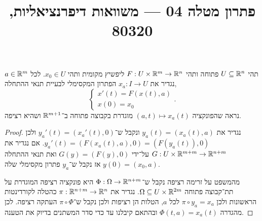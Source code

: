 
\title{פתרון מטלה 04 --- משוואות דיפרנציאליות, 80320}

\DeclareMathOperator{\sgn}{sgn}


\maketitle
\maketitleprint[blue]{}

\question{}
תהי $U \subseteq \mathbb{R}^n$ פתוחה ותהי $F : U \times \mathbb{R}^m \to \mathbb{R}^n$ ליפשיץ מקומית ותהי $x_0 \in U$.
לכל $a \in \mathbb{R}^m$ נגדיר את $x_a : I \to U$ הפתרון המקסימלי לבעיית תנאי ההתחלה,
\[
	\begin{cases}
		x'(t) = F(x(t), a) \\
		x(0) = x_0
	\end{cases}
.\]
נראה שהפונקציה $(a, t) \mapsto x_a(t)$ מוגדרת בקבוצה פתוחה ב־$\mathbb{R}^{m + 1}$ ושהיא רציפה.
\begin{proof}
	נגדיר את $y_a(t) = (x_a(t), a)$ ונקבל ש־$y_a'(t) = (x_a'(t), 0)$ ולכן $y_a'(t) = (F(x_a(t), a), 0) = (F(y_a(t)), 0)$.
	אם נגדיר את $G : U \times \mathbb{R}^{m + m} \to \mathbb{R}^{n + m}$ על־ידי $G(y) = (F(y), 0)$ ואת תנאי ההתחלה $y(0) = (x_0, a)$ אז נקבל ש־$y_a$ פתרון מקסימלי שלה.

	מהמשפט על זרימה רציפה נקבל ש־$\Phi : \Omega \to \mathbb{R}^{n + m}$ היא פונקציה רציפה המוגדרת על תת־קבוצה פתוחה $\Omega \subseteq U \times \mathbb{R}^{2m}$.
	נגדיר את $\pi : \mathbb{R}^{n + m} \to \mathbb{R}^{n}$ כהטלה לקורדינטות הראשונות ולכן $\pi \circ y_a = x_a$ לכל $a$, הטלות הן רציפות ולכן נקבל ש־$\pi \circ \Phi$ העתקה רציפה.
	לכן מהגדרה $\Phi(t, a) = x_a(t)$ ובהתאם קיבלנו עד כדי סדר המשתנים בדיוק את הטענה.
\end{proof}

